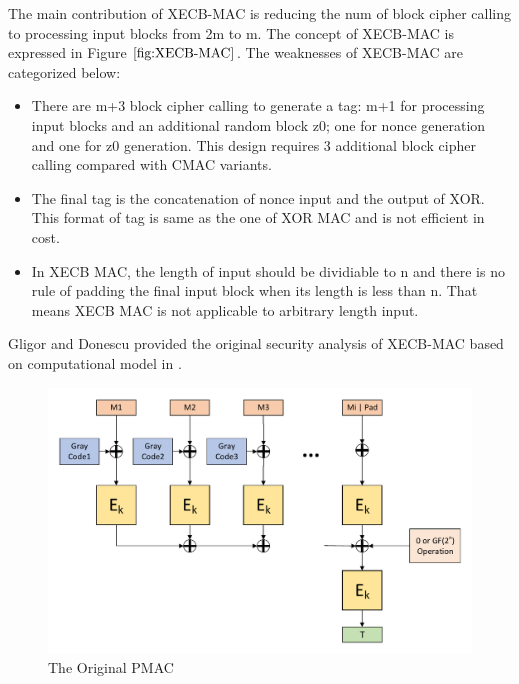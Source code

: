\documentclass{article}
\begin{document}
The main contribution of XECB-MAC is reducing the num of block cipher calling to processing input blocks from 2m to m. The concept of XECB-MAC is expressed in Figure $\ref{fig:XECB-MAC}$.
The weaknesses of XECB-MAC are categorized below:
\begin{itemize}
	\item There are m+3 block cipher calling to generate a tag: m+1 for processing input blocks and an additional random block z0; one for nonce generation and one for z0 generation. This design requires 3 additional block cipher calling compared with CMAC variants.
	\item The final tag is the concatenation of nonce input and the output of XOR. This format of tag is same as the one of XOR MAC and is not efficient in cost.
	\item In XECB MAC, the length of input should be dividiable to n and there is no rule of padding the final input block when its length is less than n. That means XECB MAC is not applicable to arbitrary length input. 
\end{itemize}

Gligor and Donescu provided the original security analysis of XECB-MAC based on computational model in \cite{gligor2002fast}. 

\begin{figure}[htbp]
\centering
\includegraphics[scale=0.5]{./diagrams/PMAC.pdf}
\caption{The Original PMAC}
\label{fig:PMAC}
\end{figure}
\end{document}
